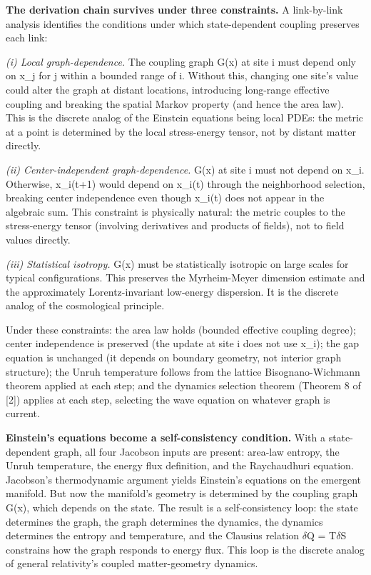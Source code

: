 \documentclass[
  11pt,
]{article}
\begin{document}
\textbf{The derivation chain survives under three constraints.} A
link-by-link analysis identifies the conditions under which
state-dependent coupling preserves each link:

\emph{(i) Local graph-dependence.} The coupling graph G(x) at site i
must depend only on x\_j for j within a bounded range of i. Without
this, changing one site's value could alter the graph at distant
locations, introducing long-range effective coupling and breaking the
spatial Markov property (and hence the area law). This is the discrete
analog of the Einstein equations being local PDEs: the metric at a point
is determined by the local stress-energy tensor, not by distant matter
directly.

\emph{(ii) Center-independent graph-dependence.} G(x) at site i must not
depend on x\_i. Otherwise, x\_i(t+1) would depend on x\_i(t) through the
neighborhood selection, breaking center independence even though x\_i(t)
does not appear in the algebraic sum. This constraint is physically
natural: the metric couples to the stress-energy tensor (involving
derivatives and products of fields), not to field values directly.

\emph{(iii) Statistical isotropy.} G(x) must be statistically isotropic
on large scales for typical configurations. This preserves the
Myrheim-Meyer dimension estimate and the approximately Lorentz-invariant
low-energy dispersion. It is the discrete analog of the cosmological
principle.

Under these constraints: the area law holds (bounded effective coupling
degree); center independence is preserved (the update at site i does not
use x\_i); the gap equation is unchanged (it depends on boundary
geometry, not interior graph structure); the Unruh temperature follows
from the lattice Bisognano-Wichmann theorem applied at each step; and
the dynamics selection theorem (Theorem 8 of {[}2{]}) applies at each
step, selecting the wave equation on whatever graph is current.

\textbf{Einstein's equations become a self-consistency condition.} With
a state-dependent graph, all four Jacobson inputs are present: area-law
entropy, the Unruh temperature, the energy flux definition, and the
Raychaudhuri equation. Jacobson's thermodynamic argument yields
Einstein's equations on the emergent manifold. But now the manifold's
geometry is determined by the coupling graph G(x), which depends on the
state. The result is a self-consistency loop: the state determines the
graph, the graph determines the dynamics, the dynamics determines the
entropy and temperature, and the Clausius relation \ensuremath{\delta}Q = T\ensuremath{\delta}S constrains
how the graph responds to energy flux. This loop is the discrete analog
of general relativity's coupled matter-geometry dynamics.
\end{document}
